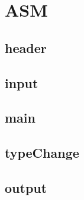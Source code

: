 \section{ASM}
\subsection{header}

\subsection{input}

\subsection{main}

\subsection{typeChange}

\subsection{output}
